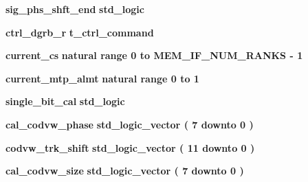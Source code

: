 \begin{DoxyCompactItemize}
{\bf sig\+\_\+phs\+\_\+shft\+\_\+end} {\bfseries \textcolor{comment}{std\+\_\+logic}\textcolor{vhdlchar}{ }} 
\item 
{\bf ctrl\+\_\+dgrb\+\_\+r} {\bfseries {\bfseries {\bf t\+\_\+ctrl\+\_\+command}} \textcolor{vhdlchar}{ }} 
\item 
{\bf current\+\_\+cs} {\bfseries \textcolor{comment}{natural}\textcolor{vhdlchar}{ }\textcolor{vhdlchar}{ }\textcolor{vhdlchar}{ }\textcolor{keywordflow}{range}\textcolor{vhdlchar}{ }\textcolor{vhdlchar}{ } \textcolor{vhdldigit}{0} \textcolor{vhdlchar}{ }\textcolor{keywordflow}{to}\textcolor{vhdlchar}{ }\textcolor{vhdlchar}{ }\textcolor{vhdlchar}{ }\textcolor{vhdlchar}{ }{\bfseries {\bf M\+E\+M\+\_\+\+I\+F\+\_\+\+N\+U\+M\+\_\+\+R\+A\+N\+KS}} \textcolor{vhdlchar}{-\/}\textcolor{vhdlchar}{ } \textcolor{vhdldigit}{1} \textcolor{vhdlchar}{ }} 
\item 
{\bf current\+\_\+mtp\+\_\+almt} {\bfseries \textcolor{comment}{natural}\textcolor{vhdlchar}{ }\textcolor{vhdlchar}{ }\textcolor{vhdlchar}{ }\textcolor{keywordflow}{range}\textcolor{vhdlchar}{ }\textcolor{vhdlchar}{ } \textcolor{vhdldigit}{0} \textcolor{vhdlchar}{ }\textcolor{keywordflow}{to}\textcolor{vhdlchar}{ }\textcolor{vhdlchar}{ } \textcolor{vhdldigit}{1} \textcolor{vhdlchar}{ }} 
\item 
{\bf single\+\_\+bit\+\_\+cal} {\bfseries \textcolor{comment}{std\+\_\+logic}\textcolor{vhdlchar}{ }} 
\item 
{\bf cal\+\_\+codvw\+\_\+phase} {\bfseries \textcolor{comment}{std\+\_\+logic\+\_\+vector}\textcolor{vhdlchar}{ }\textcolor{vhdlchar}{(}\textcolor{vhdlchar}{ }\textcolor{vhdlchar}{ } \textcolor{vhdldigit}{7} \textcolor{vhdlchar}{ }\textcolor{keywordflow}{downto}\textcolor{vhdlchar}{ }\textcolor{vhdlchar}{ } \textcolor{vhdldigit}{0} \textcolor{vhdlchar}{ }\textcolor{vhdlchar}{)}\textcolor{vhdlchar}{ }} 
\item 
{\bf codvw\+\_\+trk\+\_\+shift} {\bfseries \textcolor{comment}{std\+\_\+logic\+\_\+vector}\textcolor{vhdlchar}{ }\textcolor{vhdlchar}{(}\textcolor{vhdlchar}{ }\textcolor{vhdlchar}{ } \textcolor{vhdldigit}{11} \textcolor{vhdlchar}{ }\textcolor{keywordflow}{downto}\textcolor{vhdlchar}{ }\textcolor{vhdlchar}{ } \textcolor{vhdldigit}{0} \textcolor{vhdlchar}{ }\textcolor{vhdlchar}{)}\textcolor{vhdlchar}{ }} 
\item 
{\bf cal\+\_\+codvw\+\_\+size} {\bfseries \textcolor{comment}{std\+\_\+logic\+\_\+vector}\textcolor{vhdlchar}{ }\textcolor{vhdlchar}{(}\textcolor{vhdlchar}{ }\textcolor{vhdlchar}{ } \textcolor{vhdldigit}{7} \textcolor{vhdlchar}{ }\textcolor{keywordflow}{downto}\textcolor{vhdlchar}{ }\textcolor{vhdlchar}{ } \textcolor{vhdldigit}{0} \textcolor{vhdlchar}{ }\textcolor{vhdlchar}{)}\textcolor{vhdlchar}{ }} 

\end{DoxyCompactItemize}

